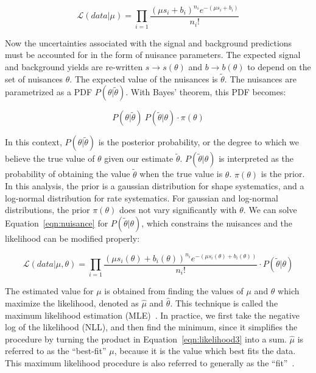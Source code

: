 \begin{equation}
\label{eqn:likelihood2}
\mathcal{L}(data|\mu) = \prod_{i=1} \frac{(\mu s_{i}+b_{i})^{n_{i}}e^{-(\mu s_{i}+b_{i})}}{n_{i}!}
\end{equation}

\noindent Now the uncertainties associated with the signal and background predictions must be accounted for in the form of nuisance parameters. The expected signal
and background yields are re-written $s \rightarrow s(\theta)$ and $b \rightarrow b(\theta)$ to depend on the set of nuisances $\theta$. The expected value of the nuisances
is $\tilde{\theta}$. The nuisances are parametrized as a PDF $P(\theta|\tilde{\theta})$. With Bayes' theorem, this PDF becomes:

\begin{equation}
\label{eqn:nuisance}
P(\theta|\tilde{\theta}) ~ P(\tilde{\theta}|\theta) \cdot \pi(\theta)
\end{equation}

In this context, $P(\theta|\tilde{\theta})$ is the posterior probability, or the degree to which we believe the true value of $\theta$ given our estimate $\tilde{\theta}$.
$P(\tilde{\theta}|\theta)$ is interpreted as the probability of obtaining the value $\tilde{\theta}$ when the true value is $\theta$. $\pi(\theta)$ is the prior.
In this analysis, the prior is a gaussian distribution for shape systematics, and a log-normal distribution for rate systematics. For gaussian and log-normal distributions,
the prior $\pi(\theta)$ does not vary significantly with $\theta$. We can solve Equation~\ref{eqn:nuisance} for $P(\tilde{\theta}|\theta)$, which constrains the nuisances
and the likelihood can be modified properly:

\begin{equation}
\label{eqn:likelihood3}
\mathcal{L}(data|\mu,\theta) = \prod_{i=1} \frac{(\mu s_{i}(\theta)+b_{i}(\theta))^{n_{i}}e^{-(\mu s_{i}(\theta)+b_{i}(\theta))}}{n_{i}!} \cdot P(\tilde{\theta}|\theta)
\end{equation}

\noindent The estimated value for $\mu$ is obtained from finding the values of $\mu$ and $\theta$ which maximize the likelihood, denoted as $\hat{\mu}$ and $\hat{\theta}$.
This technique is called the maximum likelihood estimation (MLE)~\cite{lista}.
In practice, we first take the negative log of the likelihood (NLL), and then find the minimum, since it simplifies
the procedure by turning the product in Equation~\ref{eqn:likelihood3} into a sum. $\hat{\mu}$ is referred to as the ``best-fit'' $\mu$, because it is the value which best fits the data.
This maximum likelihood procedure is also referred to generally as the ``fit''~\cite{CMS-AN-11-298}. 

